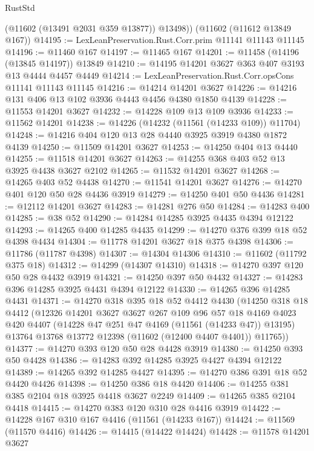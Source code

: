 \begin{lexlean}{RustStd}
\begin{coremodule}
        (@11602 (@13491 @2031 @359 @13877))
        @13498))
    (@11602 (@11612 @13849 @167))
@14195 := LexLeanPreservation.Rust.Corr.prim @11141 @11143 @11145
@14196 := @11460 @167
@14197 := @11465 @167
@14201 := @11458 (@14196 (@13845 @14197)) @13849
@14210 := @14195 @14201 @3627 @363 @407 @3193 @13 @4444 @4457 @4449
@14214 := LexLeanPreservation.Rust.Corr.opsCons @11141 @11143 @11145
@14216 := @14214 @14201 @3627
@14226 := @14216 @131 @406 @13 @102 @3936 @4443 @4456 @4380 @1850 @4139
@14228 := @11553 @14201 @3627
@14232 := @14228 @109 @13 @109 @3936
@14233 := @11562 @14201
@14238 := @14226 (@14232 (@11561 (@14233 @109)) @11704)
@14248 := @14216 @404 @120 @13 @28 @4440 @3925 @3919 @4380 @1872 @4139
@14250 := @11509 @14201 @3627
@14253 := @14250 @404 @13 @4440
@14255 := @11518 @14201 @3627
@14263 := @14255 @368 @403 @52 @13 @3925 @4438 @3627 @2102
@14265 := @11532 @14201 @3627
@14268 := @14265 @403 @52 @4438
@14270 := @11541 @14201 @3627
@14276 := @14270 @401 @120 @50 @28 @4436 @3919
@14279 := @14250 @401 @50 @4436
@14281 := @12112 @14201 @3627
@14283 := @14281 @276 @50
@14284 := @14283 @400
@14285 := @38 @52
@14290 := @14284 @14285 @3925 @4435 @4394 @12122
@14293 := @14265 @400 @14285 @4435
@14299 := @14270 @376 @399 @18 @52 @4398 @4434
@14304 := @11778 @14201 @3627 @18 @375 @4398
@14306 := @11786 (@11787 @4398)
@14307 := @14304 @14306
@14310 := @11602 (@11792 @375 @18)
@14312 := @14299 (@14307 @14310)
@14318 := @14270 @397 @120 @50 @28 @4432 @3919
@14321 := @14250 @397 @50 @4432
@14327 := @14283 @396 @14285 @3925 @4431 @4394 @12122
@14330 := @14265 @396 @14285 @4431
@14371 := @14270
    @318
    @395
    @18
    @52
    @4412
    @4430
    (@14250
      @318
      @18
      @4412
      (@12326
        @14201
        @3627
        @3627
        @267
        @109
        @96
        @57
        @18
        @4169
        @4023
        @420
        @4407
        (@14228 @47 @251 @47 @4169 (@11561 (@14233 @47)) @13195)
        @13764
        @13768
        @13772
        @12398
        (@11602 (@12400 @4407 @4401))
        @11765))
@14377 := @14270 @393 @120 @50 @28 @4428 @3919
@14380 := @14250 @393 @50 @4428
@14386 := @14283 @392 @14285 @3925 @4427 @4394 @12122
@14389 := @14265 @392 @14285 @4427
@14395 := @14270 @386 @391 @18 @52 @4420 @4426
@14398 := @14250 @386 @18 @4420
@14406 := @14255 @381 @385 @2104 @18 @3925 @4418 @3627 @2249
@14409 := @14265 @385 @2104 @4418
@14415 := @14270 @383 @120 @310 @28 @4416 @3919
@14422 := @14228 @167 @310 @167 @4416 (@11561 (@14233 @167))
@14424 := @11569 (@11570 @4416)
@14426 := @14415 (@14422 @14424)
@14428 := @11578 @14201 @3627

\end{coremodule}
\end{lexlean}
